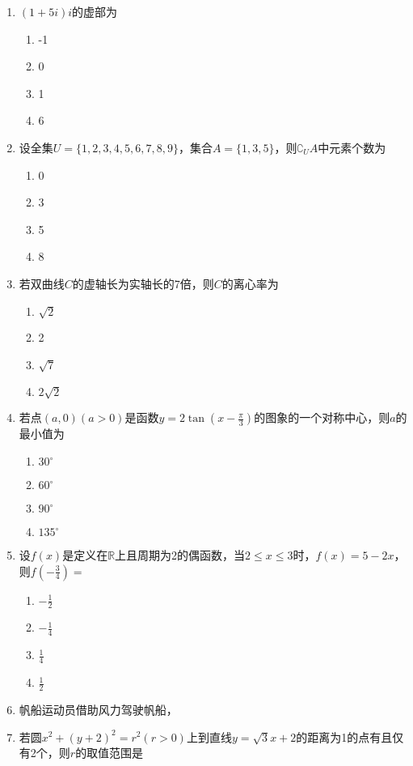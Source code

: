 \documentclass[UTF8]{ctexart}
\begin{document}
	\begin{enumerate}
		\item \((1 + 5i)i\)的虚部为
		\begin{enumerate}[label = A.]
			\item -1
			\item 0
			\item 1
			\item 6
		\end{enumerate}
		\item 设全集\(U = \{1,2,3,4,5,6,7,8,9\}\)，集合\(A = \{1,3,5\}\)，则\(\complement_U A\)中元素个数为
		\begin{enumerate}[label = A.]
			\item 0
			\item 3
			\item 5
			\item 8
		\end{enumerate}
		\item 若双曲线\(C\)的虚轴长为实轴长的7倍，则\(C\)的离心率为
		\begin{enumerate}[label = A.]
			\item \(\sqrt{2}\)
			\item 2
			\item \(\sqrt{7}\)
			\item \(2\sqrt{2}\)
		\end{enumerate}
		\item 若点\((a,0)(a > 0)\)是函数\(y = 2\tan(x - \frac{\pi}{3})\)的图象的一个对称中心，则\(a\)的最小值为
		\begin{enumerate}[label = A.]
			\item \(30^{\circ}\)
			\item \(60^{\circ}\)
			\item \(90^{\circ}\)
			\item \(135^{\circ}\)
		\end{enumerate}
		\item 设\(f(x)\)是定义在\(\mathbb{R}\)上且周期为2的偶函数，当\(2\leq x\leq3\)时，\(f(x)=5 - 2x\)，则\(f(-\frac{3}{4})=\)
		\begin{enumerate}[label = A.]
			\item \(-\frac{1}{2}\)
			\item \(-\frac{1}{4}\)
			\item \(\frac{1}{4}\)
			\item \(\frac{1}{2}\)
		\end{enumerate}
		\item 帆船运动员借助风力驾驶帆船，
		\item 若圆\(x^{2}+(y + 2)^{2}=r^{2}(r > 0)\)上到直线\(y=\sqrt{3}x + 2\)的距离为1的点有且仅有2个，则\(r\)的取值范围是

\end{enumerate}
\end{document}
